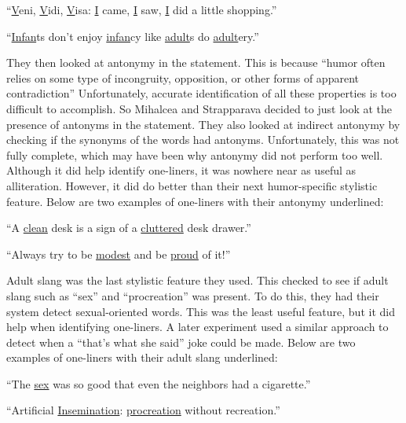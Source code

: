 ``\underline{V}eni, \underline{V}idi, \underline{V}isa: \underline{I} came, \underline{I} saw, \underline{I} did a little shopping.'' \cite{oneliners}

``\underline{Infan}ts don’t enjoy \underline{infan}cy like \underline{adult}s do \underline{adult}ery.'' \cite{oneliners}\newline

They then looked at antonymy in the statement. This is because ``humor often relies on some type of incongruity, opposition, or other forms of apparent contradiction'' \cite{oneliners} Unfortunately, accurate identification of all these properties is too difficult to accomplish. So Mihalcea and Strapparava decided to just look at the presence of antonyms in the statement. They also looked at indirect antonymy by checking if the synonyms of the words had antonyms. Unfortunately, this was not fully complete, which may have been why antonymy did not perform too well. Although it did help identify one-liners, it was nowhere near as useful as alliteration. However, it did do better than their next humor-specific stylistic feature.\cite{oneliners} Below are two examples of one-liners with their antonymy underlined:\newline

``A \underline{clean} desk is a sign of a \underline{cluttered} desk drawer.''\cite{oneliners}

``Always try to be \underline{modest} and be \underline{proud} of it!''\cite{oneliners}\newline

Adult slang was the last stylistic feature they used. This checked to see if adult slang such as ``sex'' and ``procreation'' was present. To do this, they had their system detect sexual-oriented words. This was the least useful feature, but it did help when identifying one-liners.\cite {oneliners} A later experiment used a similar approach to detect when a ``that's what she said'' joke could be made.\cite {twss} Below are two examples of one-liners with their adult slang underlined:\newline

``The \underline{sex} was so good that even the neighbors had a cigarette.''\cite{oneliners}

``Artificial \underline{Insemination}: \underline{procreation} without recreation.''\cite{oneliners}


